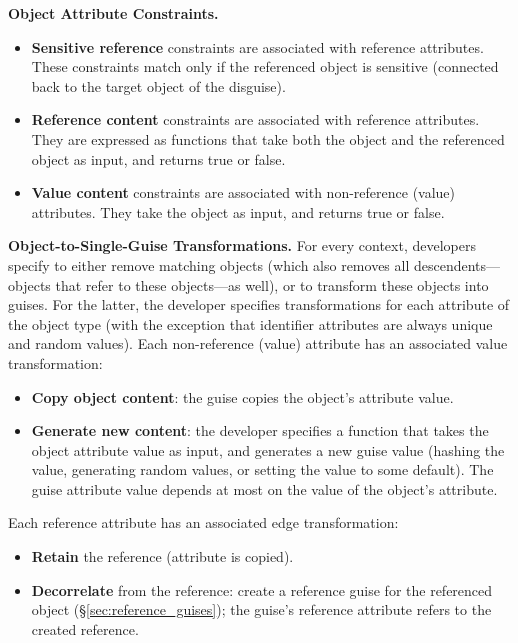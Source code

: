 \vspace{\baselineskip}
\noindent\textbf{Object Attribute Constraints.} 
\begin{itemize}[nosep]
\item \textbf{Sensitive reference} constraints are associated with reference attributes.
    These constraints match only if the referenced object is sensitive (\ie connected back to the target object of
    the disguise).
\item \textbf{Reference content} constraints are associated with reference attributes. They are
    expressed as functions that take both the object and the referenced object as input, and returns true or false. 
\item \textbf{Value content} constraints are associated with non-reference (value) attributes. They
    take the object as input, and returns true or false.
\end{itemize}

\vspace{\baselineskip}
\noindent\textbf{Object-to-Single-Guise Transformations.}
For every context, developers specify to either remove matching objects (which also removes all descendents---objects that refer to these
objects---as well), or to transform these objects into guises.
For the latter, the developer specifies transformations for each
attribute of the object type (with the exception that identifier attributes are always unique and
random values).
%
Each non-reference (value) attribute has an associated value transformation:
\begin{itemize}[nosep]
    \item \textbf{Copy object content}: the guise copies the object's attribute value.
    \item \textbf{Generate new content}: the developer specifies a function that takes the object
        attribute value as input, and generates a new guise value (\eg hashing the value, generating
        random values, or setting the value to some default).
        The guise attribute value depends at most on the value of the object's attribute.
\end{itemize}

\noindent Each reference attribute has an associated edge transformation:
\begin{itemize}[nosep]
    \item \textbf{Retain} the reference (attribute is copied).
    \item \textbf{Decorrelate} from the reference: create a reference guise for the referenced
        object (\S\ref{sec:reference_guises}); the guise's reference attribute refers to the
        created reference.
\end{itemize}

